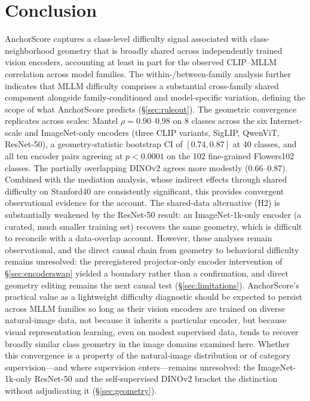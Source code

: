 \documentclass[a4paper,fleqn]{cas-sc}
\begin{document}
\section{Conclusion}
\label{sec:conclusion}

AnchorScore captures a class-level difficulty signal associated with class-neighborhood geometry that is broadly shared across independently trained vision encoders, accounting at least in part for the observed CLIP--MLLM correlation across model families. The within-/between-family analysis further indicates that MLLM difficulty comprises a substantial cross-family shared component alongside family-conditioned and model-specific variation, defining the scope of what AnchorScore predicts (\S\ref{sec:ruleout}). The geometric convergence replicates across scales: Mantel $\rho=0.90$--$0.98$ on 8 classes across the six Internet-scale and ImageNet-only encoders (three CLIP variants, SigLIP, QwenViT, ResNet-50), a geometry-statistic bootstrap CI of $[0.74, 0.87]$ at 40 classes, and all ten encoder pairs agreeing at $p<0.0001$ on the 102 fine-grained Flowers102 classes. The partially overlapping DINOv2 agrees more modestly ($0.66$--$0.87$). Combined with the mediation analysis, whose indirect effects through shared difficulty on Stanford40 are consistently significant, this provides convergent observational evidence for the account. The shared-data alternative (H2) is substantially weakened by the ResNet-50 result: an ImageNet-1k-only encoder (a curated, much smaller training set) recovers the same geometry, which is difficult to reconcile with a data-overlap account. However, these analyses remain observational, and the direct causal chain from geometry to behavioral difficulty remains unresolved: the preregistered projector-only encoder intervention of \S\ref{sec:encoderswap} yielded a boundary rather than a confirmation, and direct geometry editing remains the next causal test (\S\ref{sec:limitations}). AnchorScore's practical value as a lightweight difficulty diagnostic should be expected to persist across MLLM families so long as their vision encoders are trained on diverse natural-image data, not because it inherits a particular encoder, but because visual representation learning, even on modest supervised data, tends to recover broadly similar class geometry in the image domains examined here. Whether this convergence is a property of the natural-image distribution or of category supervision---and where supervision enters---remains unresolved: the ImageNet-1k-only ResNet-50 and the self-supervised DINOv2 bracket the distinction without adjudicating it (\S\ref{sec:geometry}).
\end{document}
